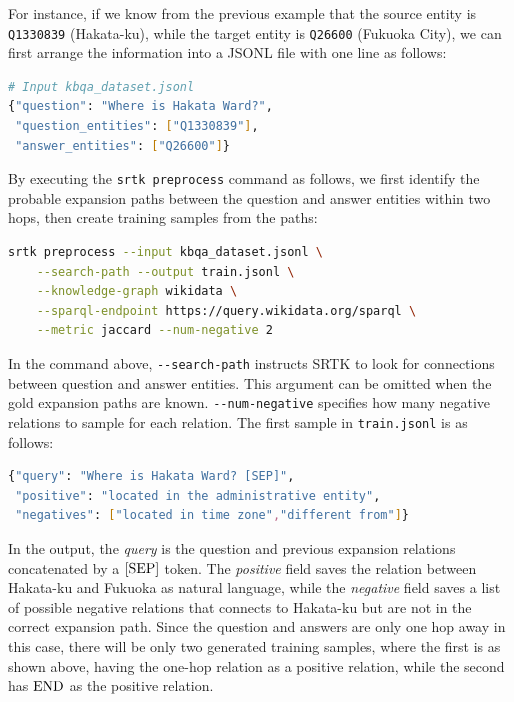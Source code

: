 \documentclass[runningheads]{llncs}
\begin{document}
For instance, if we know from the previous example that the source entity is \texttt{Q1330839} (Hakata-ku), while the target entity is \texttt{Q26600} (Fukuoka City), we can first arrange the information into a JSONL file with one line as follows:

\begin{lstlisting}[language=bash]
# Input kbqa_dataset.jsonl
{"question": "Where is Hakata Ward?",
 "question_entities": ["Q1330839"],
 "answer_entities": ["Q26600"]}
\end{lstlisting}

By executing the \texttt{srtk preprocess} command as follows, we first identify the probable expansion paths between the question and answer entities within two hops, then create training samples from the paths:

\begin{lstlisting}[language=bash]
srtk preprocess --input kbqa_dataset.jsonl \
    --search-path --output train.jsonl \
    --knowledge-graph wikidata \
    --sparql-endpoint https://query.wikidata.org/sparql \
    --metric jaccard --num-negative 2
\end{lstlisting}

In the command above, \texttt{-{}-search\allowbreak-path} instructs SRTK to look for connections between question and answer entities. This argument can be omitted when the gold expansion paths are known. \texttt{-{}-num-negative} specifies how many negative relations to sample for each relation. The first sample in \texttt{train.jsonl} is as follows:

\begin{lstlisting}[language=bash]
{"query": "Where is Hakata Ward? [SEP]",
 "positive": "located in the administrative entity",
 "negatives": ["located in time zone","different from"]}
\end{lstlisting}

In the output, the \textit{query} is the question and previous expansion relations concatenated by a $\textnormal{[SEP]}$ token. The \textit{positive} field saves the relation between Hakata-ku and Fukuoka as natural language, while the \textit{negative} field saves a list of possible negative relations that connects to Hakata-ku but are not in the correct expansion path. Since the question and answers are only one hop away in this case, there will be only two generated training samples, where the first is as shown above, having the one-hop relation as a positive relation, while the second has $\textnormal{END}$ as the positive relation.
\end{document}
